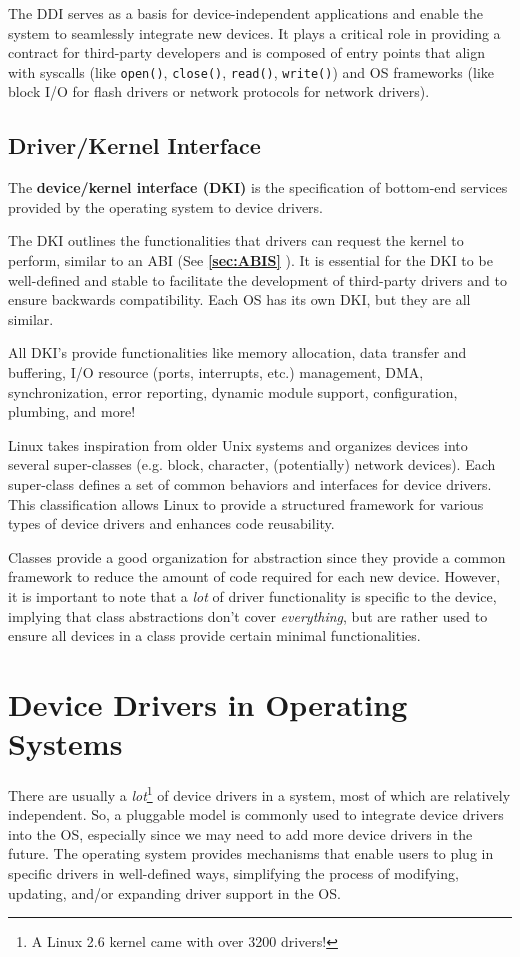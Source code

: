 \documentclass{report}
\newcommand{\definitionBegin}[1]{\begin{tcolorbox}[title={Definition: #1}]}
\newcommand{\definitionEnd}{\end{tcolorbox}}
\newcommand{\exampleBegin}[1]{\begin{tcolorbox}[colback=blue!5!white,colframe=black!75!blue,title={Example:
      #1}]}
\newcommand{\exampleEnd}{\end{tcolorbox}}
\newcommand{\refto}[2]{\textbf{\ref{#1:#2} \nameref{#1:#2}}}
\begin{document}
The DDI serves as a basis for device-independent applications and enable the system to seamlessly
integrate new devices. It plays a critical role in providing a contract for third-party developers
and is composed of entry points that align with syscalls (like \texttt{open()}, \texttt{close()},
\texttt{read()}, \texttt{write()}) and OS frameworks (like block I/O for flash drivers or network
protocols for network drivers).


\subsection{Driver/Kernel Interface}
\definitionBegin{Device/Kernel Interface}
The \textbf{device/kernel interface (DKI)} is the specification of bottom-end services provided by
the operating system to device drivers.
\definitionEnd

The DKI outlines the functionalities that drivers can request the kernel to perform, similar to an
ABI (See \refto{sec}{ABIS}). It is essential for the DKI to be well-defined and stable to facilitate
the development of third-party drivers and to ensure backwards compatibility. Each OS has its own
DKI, but they are all similar.

\exampleBegin{``You'll Never Find Someone Like Me''}
All DKI's provide functionalities like memory allocation, data transfer and buffering, I/O resource
(ports, interrupts, etc.) management, DMA, synchronization, error reporting, dynamic module support,
configuration, plumbing, and more!
\exampleEnd

\exampleBegin{Linux Device Driver Abstractions}
Linux takes inspiration from older Unix systems and organizes devices into several super-classes
(e.g. block, character, (potentially) network devices). Each super-class defines a set of common
behaviors and interfaces for device drivers. This classification allows Linux to provide a
structured framework for various types of device drivers and enhances code reusability.

Classes provide a good organization for abstraction since they provide a common framework to reduce
the amount of code required for each new device. However, it is important to note that a
\textit{lot} of driver functionality is specific to the device, implying that class abstractions
don't cover \textit{everything}, but are rather used to ensure all devices in a class provide
certain minimal functionalities.
\exampleEnd

\section{Device Drivers in Operating Systems}
There are usually a \textit{lot}\footnote{A Linux 2.6 kernel came with over 3200 drivers!} of device
drivers in a system, most of which are relatively independent. So, a pluggable model is commonly
used to integrate device drivers into the OS, especially since we may need to add more device
drivers in the future. The operating system provides mechanisms that enable users to plug in
specific drivers in well-defined ways, simplifying the process of modifying, updating, and/or
expanding driver support in the OS.
\end{document}

